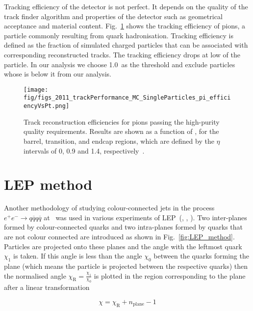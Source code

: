 Tracking efficiency of the detector is not perfect. It depends on the quality of the track finder algorithm and properties of the detector such as geometrical acceptance and material content. Fig.~\ref{fig:2011_trackPerformance_MC_SingleParticles_pi_efficiencyVsPt} shows the tracking efficiency of pions, a particle commonly resulting from quark hadronisation. Tracking efficiency is defined as the fraction of simulated charged particles that can be associated with corresponding reconstructed tracks. The tracking efficiency drops at low \pt of the particle. In our analysis we choose 1.0~\GeV as the threshold and exclude particles whose \pt is below it from our analysis.

\begin{figure}[hbtp]
  \centering
    \texttt{[image: fig/figs\_2011\_trackPerformance\_MC\_SingleParticles\_pi\_efficiencyVsPt.png]}
    \caption{Track reconstruction efficiencies for pions passing the high-purity quality requirements. Results are shown as a function of \pt, for the barrel, transition, and endcap regions, which are defined by the $\eta$ intervals of 0, 0.9 and 1.4, respectively~\cite{Chatrchyan:2014fea}.}
    \label{fig:2011_trackPerformance_MC_SingleParticles_pi_efficiencyVsPt}
\end{figure}

\section{LEP method}

Another methodology of studying colour-connected jets in the process $e^{+}e^{-}\rightarrow q\overline{q}q\overline{q}$ at ~\GeV was used in various experiments of LEP~(\cite{Abdallah:2006uq}, \cite{Abbiendi:2005es}, \cite{Achard:2003pe}). Two inter-\PW planes formed by colour-connected quarks and two intra-\PW planes formed by quarks that are not colour connected are introduced as shown in Fig.~\ref{fig:LEP_method}. Particles are projected onto these planes and the angle with the leftmost quark $\chi_{1}$ is taken. If this angle is less than the angle $\chi_{0}$ between the quarks forming the plane (which means the particle is projected between the respective quarks) then the normalised angle $\chi_{\text{R}}=\frac{\chi_{1}}{\chi_{0}}$ is plotted in the region corresponding to the plane after a linear transformation

\begin{equation}
  \chi=\chi_{\text{R}}+n_{\text{plane}}-1
\end{equation}

